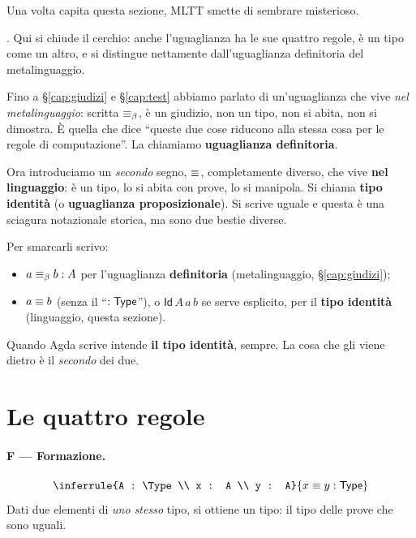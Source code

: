 \epigraph{Una volta capita questa sezione, MLTT smette di sembrare misterioso.}{}

. Qui si chiude il cerchio: anche l'uguaglianza ha le sue quattro regole, \`e un tipo come un altro, e si distingue nettamente dall'uguaglianza definitoria del metalinguaggio.

\bigskip

Fino a \S\ref{cap:giudizi} e \S\ref{cap:test} abbiamo parlato di un'uguaglianza che vive \emph{nel metalinguaggio}: scritta $\equiv_{\beta}$, \`e un giudizio, non un tipo, non si abita, non si dimostra. \`E quella che dice ``queste due cose riducono alla stessa cosa per le regole di computazione''. La chiamiamo \textbf{uguaglianza definitoria}.

Ora introduciamo un \emph{secondo} segno, $\equiv$, completamente diverso, che vive \textbf{nel linguaggio}: \`e un tipo, lo si abita con prove, lo si manipola. Si chiama \textbf{tipo identit\`a} (o \textbf{uguaglianza proposizionale}). Si scrive uguale e questa \`e una sciagura notazionale storica, ma sono due bestie diverse.

\medskip

Per smarcarli scrivo:
\begin{itemize}
\item $a \equiv_{\beta} b : A$ per l'uguaglianza \textbf{definitoria} (metalinguaggio, \S\ref{cap:giudizi});
\item $a \equiv b$ (senza il ``$: \mathsf{Type}$''), o $\mathsf{Id}\,A\,a\,b$ se serve esplicito, per il \textbf{tipo identit\`a} (linguaggio, questa sezione).
\end{itemize}

Quando Agda scrive  intende \textbf{il tipo identit\`a}, sempre. La cosa che gli viene dietro \`e il \emph{secondo} dei due.

\section*{Le quattro regole}

\paragraph{F --- Formazione.}
\[
\inferrule{A : \Type \\ x : A \\ y : A}{x \identita y : \Type}
\]
Dati due elementi di \emph{uno stesso} tipo, si ottiene un tipo: il tipo delle prove che sono uguali.

